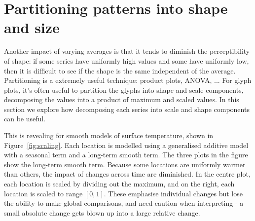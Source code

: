 \documentclass[oneside]{article}
\begin{document}
\section{Partitioning patterns into shape and size}

Another impact of varying averages is that it tends to diminish the perceptibility of shape: if some series have uniformly high values and some have uniformly low, then it is difficult to see if the shape is the same independent of the average. Partitioning is a extremely useful technique: product plots, ANOVA, ...  For glyph plots, it's often useful to partition the glyphs into shape and scale components, decomposing the values into a product of maximum and scaled values.  In this section we explore how decomposing each series into scale and shape components can be useful.

This is revealing for smooth models of surface temperature, shown in Figure~\ref{fig:scaling}. Each location is modelled using a generalised additive model \citep{wood:2006} with a seasonal term and a long-term smooth term. The three plots in the figure show the long-term smooth term. Because some locations are uniformly warmer than others, the impact of changes across time are diminished. In the centre plot, each location is scaled by dividing out the maximum, and on the right, each location is scaled to range $[0, 1]$. These emphasise individual changes but lose the ability to make global comparisons, and need caution when interpreting - a small absolute change gets blown up into a large relative change.
\end{document}
